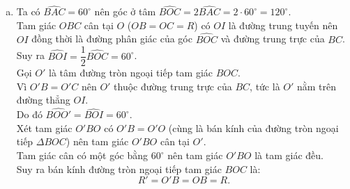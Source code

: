 \begin{bt}
{\begin{enumerate}[a)]
	Vậy $EG \perp AQ$.
	\item Ta có $\widehat{BAC} = 60^\circ$ nên góc ở tâm $\widehat{BOC} = 2\widehat{BAC} = 2 \cdot 60^\circ = 120^\circ$.\\
	Tam giác $OBC$ cân tại $O$ ($OB = OC = R$) có $OI$ là đường trung tuyến nên $OI$ đồng thời là đường phân giác của góc $\widehat{BOC}$ và đường trung trực của $BC$.\\
	Suy ra $\widehat{BOI} = \dfrac{1}{2}\widehat{BOC} = 60^\circ$.\\
	Gọi $O'$ là tâm đường tròn ngoại tiếp tam giác $BOC$.\\
	Vì $O'B = O'C$ nên $O'$ thuộc đường trung trực của $BC$, tức là $O'$ nằm trên đường thẳng $OI$.\\
	Do đó $\widehat{BOO'} = \widehat{BOI} = 60^\circ$.\\
	Xét tam giác $O'BO$ có $O'B = O'O$ (cùng là bán kính của đường tròn ngoại tiếp $\Delta BOC$) nên tam giác $O'BO$ cân tại $O'$.\\
	Tam giác cân có một góc bằng $60^\circ$ nên tam giác $O'BO$ là tam giác đều.\\
	Suy ra bán kính đường tròn ngoại tiếp tam giác $BOC$ là:
	$$R' = O'B = OB = R.$$
\end{enumerate}
}
\end{bt}




